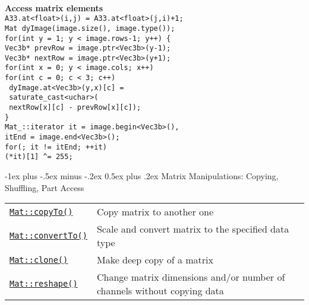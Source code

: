 \documentclass[10pt,landscape]{article}
\makeatletter
\renewcommand{\section}{\@startsection{section}{1}{0mm}%
                                {-1ex plus -.5ex minus -.2ex}%
                                {0.5ex plus .2ex}%
                                {\normalfont\large\bfseries}}
\makeatother
\begin{document}
\begin{multicols}{3}
\begin{tabbing}
\>\\
\textbf{Access matrix elements}\\
\> \texttt{A33.at<float>(i,j) = A33.at<float>(j,i)+1;}\\
\> \texttt{Mat dyImage(image.size(), image.type());}\\
\> \texttt{for(int y = 1; y < image.rows-1; y++) \{}\\
\> \> \texttt{Vec3b* prevRow = image.ptr<Vec3b>(y-1);}\\
\> \> \texttt{Vec3b* nextRow = image.ptr<Vec3b>(y+1);}\\
\> \> \texttt{for(int x = 0; y < image.cols; x++)}\\
\> \> \> \texttt{for(int c = 0; c < 3; c++)}\\
\> \> \> \texttt{  dyImage.at<Vec3b>(y,x)[c] =}\\
\> \> \> \texttt{    saturate\_cast<uchar>(}\\
\> \> \> \texttt{       nextRow[x][c] - prevRow[x][c]);}\\
\> \texttt{\} }\\
\> \texttt{Mat\_<Vec3b>::iterator it = image.begin<Vec3b>(),}\\
\> \> \texttt{itEnd = image.end<Vec3b>();}\\
\> \texttt{for(; it != itEnd; ++it)}\\
\> \> \texttt{(*it)[1] \textasciicircum{}= 255;}\\

\end{tabbing}

\section{Matrix Manipulations: Copying, Shuffling, Part Access}
\begin{tabular}{@{}p{\the\MyLen}%
                @{}p{\linewidth-\the\MyLen}@{}}
\texttt{\href{http://opencv.willowgarage.com/documentation/cpp/basic_structures.html\#Mat::copyTo}{Mat::copyTo()}} & Copy matrix to another one \\
\texttt{\href{http://opencv.willowgarage.com/documentation/cpp/basic_structures.html\#Mat::convertTo}{Mat::convertTo()}} & Scale and convert matrix to the specified data type \\
\texttt{\href{http://opencv.willowgarage.com/documentation/cpp/basic_structures.html\#Mat::clone}{Mat::clone()}} & Make deep copy of a matrix \\
\texttt{\href{http://opencv.willowgarage.com/documentation/cpp/basic_structures.html\#Mat::reshape}{Mat::reshape()}} & Change matrix dimensions and/or number of channels without copying data \\


\end{tabular}
\end{multicols}
\end{document}
